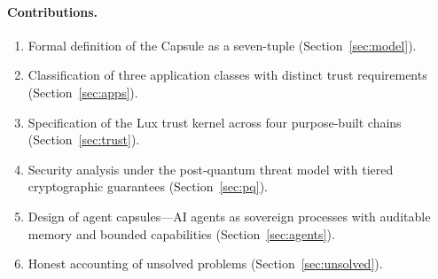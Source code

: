 \paragraph{Contributions.}
\begin{enumerate}[label=(\roman*),nosep]
  \item Formal definition of the Capsule as a seven-tuple (Section~\ref{sec:model}).
  \item Classification of three application classes with distinct trust requirements
        (Section~\ref{sec:apps}).
  \item Specification of the Lux trust kernel across four purpose-built chains
        (Section~\ref{sec:trust}).
  \item Security analysis under the post-quantum threat model with tiered
        cryptographic guarantees (Section~\ref{sec:pq}).
  \item Design of agent capsules---AI agents as sovereign processes with auditable
        memory and bounded capabilities (Section~\ref{sec:agents}).
  \item Honest accounting of unsolved problems (Section~\ref{sec:unsolved}).
\end{enumerate}

